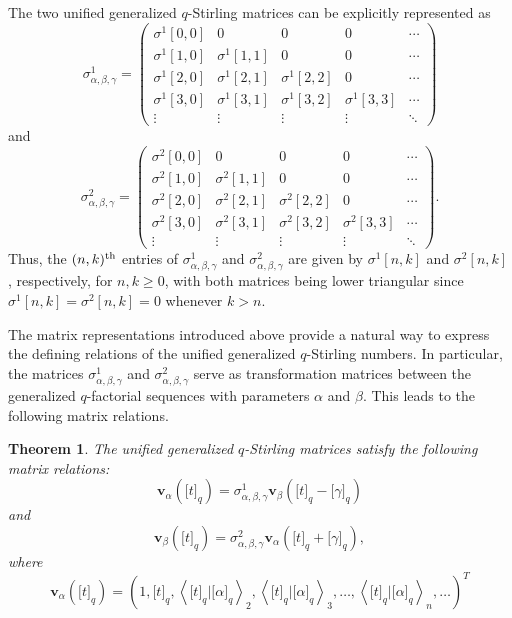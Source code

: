 \documentclass[12pt]{article}
\newtheorem{thm}{Theorem}[section]
\def\v{\mathbf{v}}
\begin{document}
The two unified generalized $q$-Stirling matrices can be explicitly represented as
\begin{equation}
	\sigma^1_{\alpha,\beta,\gamma}=
	\begin{pmatrix}
		\sigma^1[0,0] & 0 & 0 & 0 & \cdots \\
		\sigma^1[1,0] & \sigma^1[1,1] & 0 & 0 & \cdots \\
		\sigma^1[2,0] & \sigma^1[2,1] & \sigma^1[2,2] & 0 & \cdots \\
		\sigma^1[3,0] & \sigma^1[3,1] & \sigma^1[3,2] & \sigma^1[3,3] & \cdots \\
		\vdots & \vdots & \vdots & \vdots & \ddots
	\end{pmatrix}
\end{equation}
and
\begin{equation}
	\sigma^2_{\alpha,\beta,\gamma}=
	\begin{pmatrix}
		\sigma^2[0,0] & 0 & 0 & 0 & \cdots \\
		\sigma^2[1,0] & \sigma^2[1,1] & 0 & 0 & \cdots \\
		\sigma^2[2,0] & \sigma^2[2,1] & \sigma^2[2,2] & 0 & \cdots \\
		\sigma^2[3,0] & \sigma^2[3,1] & \sigma^2[3,2] & \sigma^2[3,3] & \cdots \\
		\vdots & \vdots & \vdots & \vdots & \ddots
	\end{pmatrix}.
\end{equation}
Thus, the $(n,k)^{\rm th}$ entries of $\sigma^1_{\alpha,\beta,\gamma}$ and $\sigma^2_{\alpha,\beta,\gamma}$ are given by $\sigma^1[n,k]$ and $\sigma^2[n,k]$, respectively, for $n,k\geq 0$, with both matrices being lower triangular since $\sigma^1[n,k]=\sigma^2[n,k]=0$ whenever $k>n$.

The matrix representations introduced above provide a natural way to express the defining relations of the unified generalized $q$-Stirling numbers. In particular, the matrices $\sigma^1_{\alpha,\beta,\gamma}$ and $\sigma^2_{\alpha,\beta,\gamma}$ serve as transformation matrices between the generalized $q$-factorial sequences with parameters $\alpha$ and $\beta$. This leads to the following matrix relations.

\begin{thm}\label{thm2}
	The unified generalized $q$-Stirling matrices satisfy the following matrix relations:
	\begin{equation}
		\v_{\alpha}\left(\big[t\big]_q\right)=\sigma^1_{\alpha,\beta,\gamma}\v_{\beta}\left(\big[t\big]_q-\big[\gamma\big]_q\right)\label{result3}
	\end{equation} and
	\begin{equation}
		\v_{\beta}\left(\big[t\big]_q\right)=\sigma^2_{\alpha,\beta,\gamma}\v_{\alpha}\left(\big[t\big]_q+\big[\gamma\big]_q\right),\label{result4}
	\end{equation}
	where
	\begin{equation}
		\v_{\alpha}\left(\big[t\big]_q\right)=\left( 1,\big[t\big]_q,\left\langle\big[t\big]_q|\big[\alpha\big]_q\right\rangle_2,\left\langle\big[t\big]_q|\big[\alpha\big]_q\right\rangle_3,\ldots,\left\langle\big[t\big]_q|\big[\alpha\big]_q\right\rangle_n,\ldots\right)^T
	\end{equation}
\end{thm}
\end{document}

